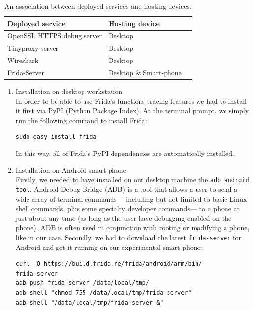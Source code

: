 \documentclass[12pt, a4paper]{report}
\begin{document}
\begin{table}[h]
\centering
    \begin{tabular}{ | l | l | p{5cm} |}
    \hline
    \textbf{Deployed service} & \textbf{Hosting device} \\ \hline
    OpenSSL HTTPS debug server & Desktop \\ \hline 
    Tinyproxy server & Desktop \\ \hline
    Wireshark & Desktop \\ \hline
    Frida-Server & Desktop \& Smart-phone \\ \hline
    \end{tabular}
    \caption{An association between deployed services and hosting devices.}
\end{table}

\begin{enumerate}
\item Installation on desktop workstation \\
In order to be able to use Frida's functions tracing features we had to install it first via PyPI (Python Package Index). At the terminal prompt, we simply run the following command to install Frida:
\begin{lstlisting}[frame=single, breaklines=true]
sudo easy_install frida
\end{lstlisting}
In this way, all of Frida’s PyPI dependencies are automatically installed.

\item Installation on Android smart phone \\
Firstly, we needed to have installed on our desktop machine the \texttt{adb android tool}. Android Debug Bridge (ADB) is a tool that allows a user to send a wide array of terminal commands —including but not limited to basic Linux shell commands, plus some specialty developer commands— to a phone at just about any time (as long as the user have debugging enabled on the phone). ADB is often used in conjunction with rooting or modifying a phone, like in our case.
Secondly, we had to download the latest \texttt{frida-server} for Android and get it running on our experimental smart phone:
\begin{lstlisting}[frame=single, breaklines=true]
curl -O https://build.frida.re/frida/android/arm/bin/
frida-server
adb push frida-server /data/local/tmp/
adb shell "chmod 755 /data/local/tmp/frida-server"
adb shell "/data/local/tmp/frida-server &"
\end{lstlisting}

\end{enumerate}   
\end{document}
